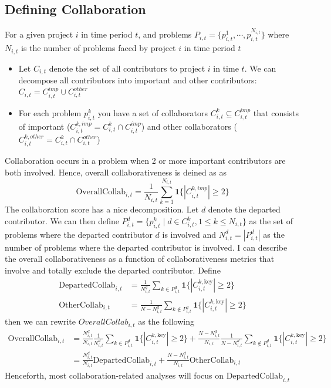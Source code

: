 \documentclass[12pt,notitlepage]{article}
\begin{document}
\subsection{Defining Collaboration} \label{sec:defining_collab}
For a given project $i$ in time period $t$, and problems $P_{i,t} = \{p_{i,t}^1, \cdots, p_{i,t}^{N_{i,t}} \}$ where $N_{i,t}$ is the number of problems faced by project $i$ in time period $t$
\begin{itemize}
    \item Let $C_{i,t}$ denote the set of all contributors to project $i$ in time $t$. We can decompose all contributors into important and other contributors: $C_{i,t} = C_{i,t}^{imp} \cup C_{i,t}^{other}$ 
    \item For each problem $p_{i,t}^k$ you have a set of collaborators $C_{i,t}^{k} \subseteq C_{i,t}^{imp} $ that consists of important ($C_{i,t}^{k, imp} = C_{i,t}^{k} \cap C_{i,t}^{imp}$) and other collaborators ($C_{i,t}^{k, other} = C_{i,t}^{k} \cap C_{i,t}^{other}$)
\end{itemize}
Collaboration occurs in a problem when 2 or more important contributors are both involved. Hence, overall collaborativeness is deined as as 
\begin{equation}
    \mathrm{OverallCollab}_{i,t} = \frac{1}{N_{i,t}}\sum_{k=1}^{N_{i,t}}\mathbf{1}\bigl\{|C_{i,t}^{k,imp}|\ge2\bigr\}
\end{equation}
The collaboration score has a nice decomposition. Let $d$ denote the departed contributor. We can then define $P_{i,t}^d = \{p_{i,t}^{k} \mid d \in C_{i,t}^k, 1 \leq k \leq N_{i,t} \}$ as the set of problems where the departed contributor $d$ is involved and $N_{i, t}^d = |P_{i,t}^d|$ as the number of problems where the departed contributor is involved. 
I can describe the overall collaborativeness as a function of collaborativeness metrics that involve and totally exclude the departed contributor. 
Define 
\begin{align*}
     \mathrm{DepartedCollab}_{i,t} &= \frac{1}{N_{i,t}^d} \sum_{k \in P_{i,t}^d} \mathbf{1}\bigl\{|C_{i,t}^{k,\mathrm{key}}|\ge2\bigr\} \\
     \mathrm{OtherCollab}_{i,t} &= \frac{1}{N-N_{i,t}^{d}} \sum_{k \notin P_{i,t}^d} \mathbf{1}\bigl\{|C_{i,t}^{k,\mathrm{key}}|\ge2\bigr\}
\end{align*}
then we can rewrite $OverallCollab_{i,t}$ as the following
\begin{align*}
    \mathrm{OverallCollab}_{i,t} &= \frac{N_{i,t}^d}{N_{i,t}} \frac{1}{N_{i,t}^d} \sum_{k \in P_{i,t}^d} \mathbf{1}\bigl\{|C_{i,t}^{k,\mathrm{key}}|\ge2\bigr\} + \frac{N-N_{i,t}^{d}}{N_{i,t}} \frac{1}{N-N_{i,t}^{d}} \sum_{k \notin P_{i,t}^d} \mathbf{1}\bigl\{|C_{i,t}^{k,\mathrm{key}}|\ge2\bigr\} \\
    &= \frac{N_{i,t}^d}{N_{i,t}}\mathrm{DepartedCollab}_{i,t} + \frac{N-N_{i,t}^{d}}{N_{i,t}} \mathrm{OtherCollab}_{i,t}
\end{align*}
Henceforth, most collaboration-related analyses will focus on $\mathrm{DepartedCollab}_{i,t}$
\end{document}
